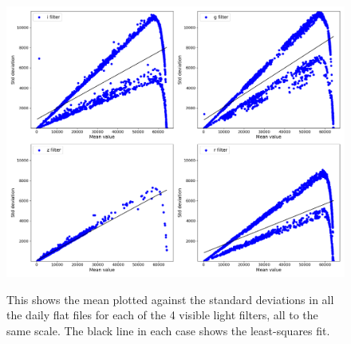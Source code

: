 \begin{figure}[!htbp]
\begin{center}
\includegraphics[scale=0.4]{images/dailyflatall.png}
\end{center}   
\caption{This shows the mean plotted against the standard deviations in all
the daily flat files for each of the 4 visible light filters, all to the same
scale. The black line in each case shows the least-squares fit.}
\protect\label{fig:dailyflatall}
\end{figure}


